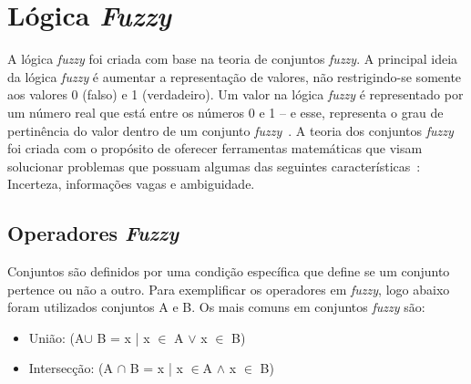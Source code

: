 \documentclass[12pt]{article}
\begin{document}
\section{Lógica \textit{Fuzzy}}
\label{sec:logfuzzy}

A lógica \textit{fuzzy} foi criada com base na teoria de conjuntos \textit{fuzzy}. A principal ideia da lógica \textit{fuzzy} é aumentar a representação de valores, não restrigindo-se somente aos valores 0 (falso) e 1 (verdadeiro). Um valor na lógica \textit{fuzzy} é representado por um número real que está entre os números 0 e 1 -- e esse, representa o grau de pertinência do valor dentro de um conjunto \textit{fuzzy}~\cite{boclin:06}. A teoria dos conjuntos \textit{fuzzy} foi criada com o propósito de oferecer ferramentas matemáticas que visam solucionar problemas que possuam algumas das seguintes características~\cite{falcao:02}: Incerteza, informações vagas e ambiguidade.


\subsection{Operadores \textit{Fuzzy}}
Conjuntos são definidos por uma condição específica que define se um conjunto pertence ou não a outro. Para exemplificar os operadores em \textit{fuzzy}, logo abaixo foram utilizados conjuntos A e B.
Os mais comuns em conjuntos \textit{fuzzy} são: 

\begin{itemize}
	\item União: (A\begin{math} \cup \end{math} B = x | x \begin{math}\in \end{math} A \begin{math}\vee \end{math} x \begin{math}\in \end{math} B)
	\item Intersecção: (A \begin{math} \cap \end{math} B = x | x \begin{math}\in \end{math}A \begin{math}\wedge \end{math} x \begin{math}\in \end{math} B)
\end{itemize}
\end{document}
